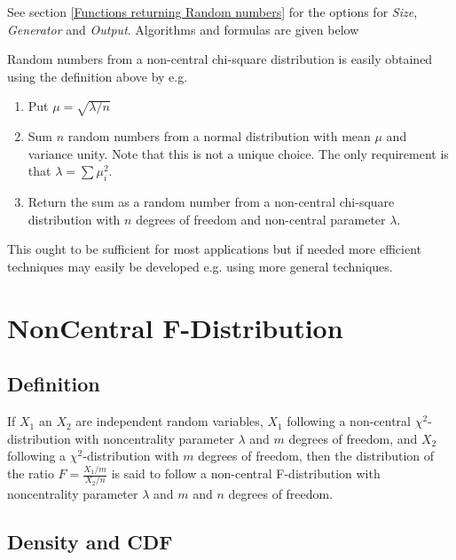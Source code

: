 \vspace{0.3cm}
See section \ref{Functions returning Random numbers} for the options for  {\itshape\sffamily Size},  {\itshape\sffamily Generator} and {\itshape\sffamily Output}. Algorithms and formulas are given below


Random numbers from a non-central chi-square distribution is easily obtained using the
deﬁnition above by e.g.

\begin{enumerate}
	\item Put $\mu = \sqrt{\lambda/n}$
	\item Sum $n$ random numbers from a normal distribution with mean $\mu$ and variance unity.
	Note that this is not a unique choice. The only requirement is that $\lambda = \sum \mu_i^2$.
	\item Return the sum as a random number from a non-central chi-square distribution with
	$n$ degrees of freedom and non-central parameter $\lambda$.
\end{enumerate}

This ought to be sufficient for most applications but if needed more efficient techniques
may easily be developed e.g. using more general techniques.





\section{NonCentral F-Distribution}
\label{NonCentralFDistributionBoost}

\subsection{Definition}
\label{NonCentralFDistributionDefinitionBoost}

If $X_1$ an $X_2$ are independent random variables, $X_1$  following a non-central $\chi^2$-distribution with noncentrality parameter $\lambda$ and $m$ degrees of freedom, and  
$X_2$  following a $\chi^2$-distribution with $m$ degrees of freedom, then the distribution of the ratio $F=\frac{X_1/m}{X_2/n}$ is said to follow a non-central
F-distribution with  noncentrality parameter $\lambda$ and  $m$ and $n$  degrees of freedom.


\subsection{Density and CDF}

